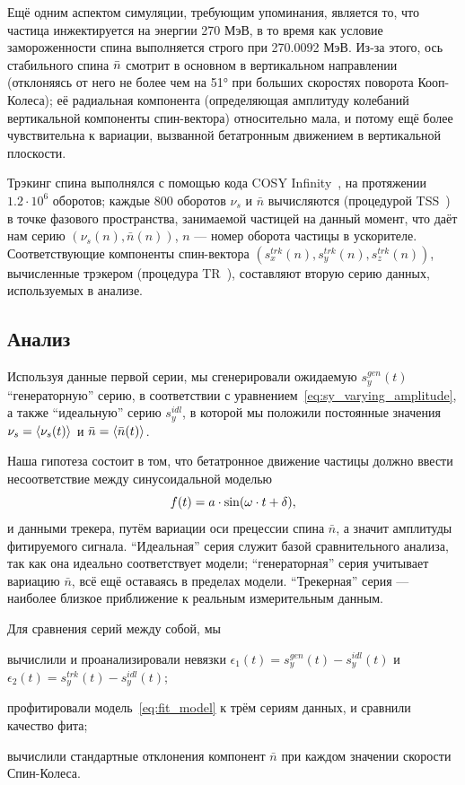 Ещё одним аспектом симуляции, требующим упоминания, является то, что частица инжектируется на энергии 270 МэВ, в то время как условие замороженности спина выполняется строго при 270.0092 МэВ. Из-за этого, ось стабильного спина $\bar n$ смотрит в основном в вертикальном направлении (отклоняясь от него не более чем на \ang{51} при больших скоростях поворота Кооп-Колеса); её радиальная компонента (определяющая амплитуду колебаний вертикальной компоненты спин-вектора) относительно мала, и потому ещё более чувствительна к вариации, вызванной бетатронным движением в вертикальной плоскости.

Трэкинг спина выполнялся с помощью кода COSY Infinity~\cite{COSYINF:Website}, на протяжении $1.2\cdot10^6$
оборотов; каждые 800 оборотов $\nu_s$ и $\bar n$ вычисляются (процедурой
TSS~\cite[стр.~41]{COSYINF:Manual:BeamPhys}) в точке фазового пространства, занимаемой частицей на данный момент,
что даёт нам серию $(\nu_s(n), \bar n(n))$, $n$ --- номер оборота частицы в ускорителе.
Соответствующие компоненты спин-вектора $(s_x^{trk}(n), s_y^{trk}(n), s_z^{trk}(n))$,
вычисленные трэкером (процедура TR~\cite[стр.~41]{COSYINF:Manual:BeamPhys}), составляют вторую серию данных,
используемых в анализе.

\subsection{Анализ}
Используя данные первой серии, мы сгенерировали ожидаемую $s_y^{gen}(t)$ ``генераторную'' серию,
в соответствии с уравнением~\eqref{eq:sy_varying_amplitude}, а также ``идеальную'' серию $s_y^{idl}$, в которой
мы положили постоянные значения $\nu_s = \avg{\nu_s(t)}$ и $\bar n =\avg{\bar n(t)}$. 

Наша гипотеза состоит в том, что бетатронное движение частицы
должно ввести несоответствие между синусоидальной моделью
\begin{equation}
  f(t) = a\cdot\sin(\omega\cdot t + \delta),\label{eq:fit_model}
\end{equation}
и данными трекера, путём вариации оси прецессии спина $\bar n$, а значит амплитуды
фитируемого сигнала. ``Идеальная'' серия служит базой сравнительного анализа,
так как она идеально соответствует модели; ``генераторная'' серия учитывает вариацию $\bar n$,
всё ещё оставаясь в пределах модели. ``Трекерная'' серия --- наиболее близкое приближение
к реальным измерительным данным.

Для сравнения серий между собой, мы
\begin{enumerate*}
\item вычислили и проанализировали невязки $\epsilon_1(t) = s_y^{gen}(t) -
  s_y^{idl}(t)$ и $\epsilon_2(t) = s_y^{trk}(t) - s_y^{idl}(t)$;
\item профитировали модель~\eqref{eq:fit_model} к трём сериям данных, и
  сравнили качество фита;
\item вычислили стандартные отклонения компонент $\bar n$ при каждом
  значении скорости Спин-Колеса.
\end{enumerate*}


